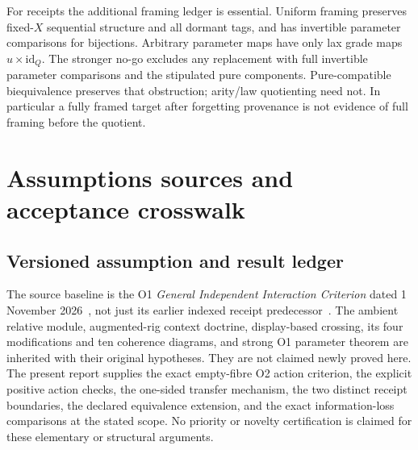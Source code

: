 \documentclass[11pt,a4paper]{article}
\theoremstyle{definition}
\newcommand{\id}{\mathrm{id}}
\begin{document}
For receipts the additional framing ledger is essential. Uniform framing
preserves fixed-$X$ sequential structure and all dormant tags, and has
invertible parameter comparisons for bijections. Arbitrary parameter maps
have only lax grade maps $u\times\id_Q$. The stronger no-go excludes any
replacement with full invertible parameter comparisons and the stipulated
pure components. Pure-compatible biequivalence preserves that obstruction;
arity/law quotienting need not. In particular a fully framed target after
forgetting provenance is not evidence of full framing before the quotient.

\section{Assumptions sources and acceptance crosswalk}\label{sec:acceptance}

\subsection{Versioned assumption and result ledger}
The source baseline is the O1 \emph{General Independent Interaction
Criterion} dated 1 November 2026~\cite{O1}, not just its earlier indexed
receipt predecessor~\cite{Receipt}. The ambient relative module,
augmented-rig context doctrine, display-based crossing, its four
modifications and ten coherence diagrams, and strong O1 parameter theorem
are inherited with their original hypotheses. They are not claimed newly
proved here. The present report supplies the exact empty-fibre O2 action
criterion, the explicit positive action checks, the one-sided transfer
mechanism, the two distinct receipt boundaries,
the declared equivalence extension, and the exact information-loss
comparisons at the stated scope. No priority or novelty certification is
claimed for these elementary or structural arguments.
\end{document}
